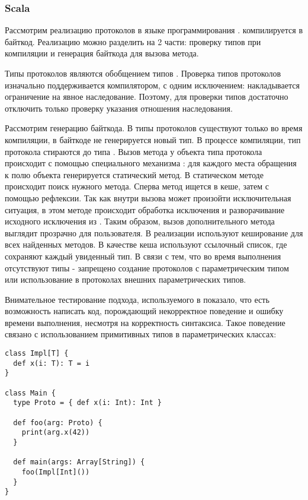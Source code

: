 \subsubsection{Scala}
Рассмотрим реализацию протоколов в языке программирования \cite{scala:structural}.  компилируется в  байткод. Реализацию можно разделить на 2 части: проверку типов при компиляции и генерация байткода для вызова метода.

Типы протоколов являются обобщением типов . Проверка типов протоколов изначально поддерживается компилятором, с одним исключением: накладывается ограничение на явное наследование. Поэтому, для проверки типов достаточно отключить только проверку указания отношения наследования.

Рассмотрим генерацию байткода. В  типы протоколов существуют только во время компиляции, в байткоде не генерируется новый тип. В процессе компиляции, тип протокола стираются до типа . Вызов метода у объекта типа протокола происходит с помощью специального механизма : для каждого места обращения к полю объекта генерируется статический метод. В статическом методе происходит поиск нужного метода. Сперва метод ищется в кеше\cite{9780262033848}, затем с помощью рефлексии. Так как внутри вызова может произойти исключительная ситуация, в этом методе происходит обработка исключения и разворачивание исходного исключения из . Таким образом, вызов дополнительного метода выглядит прозрачно для пользователя. В реализации используют кеширование для всех найденных методов. В качестве кеша используют ссылочный список, где сохраняют каждый увиденный тип. В связи с тем, что во время выполнения отсутствуют типы - запрещено создание протоколов с параметрическим типом или использование в протоколах внешних параметрических типов.

Внимательное тестирование подхода, используемого в  показало, что есть возможность написать код, порождающий некорректное поведение и ошибку времени выполнения, несмотря на корректность синтаксиса. Такое поведение связано с использованием примитивных типов в параметрических классах:

\begin{verbatim}
class Impl[T] {
  def x(i: T): T = i
}

class Main {
  type Proto = { def x(i: Int): Int }

  def foo(arg: Proto) {
    print(arg.x(42))
  }

  def main(args: Array[String]) {
    foo(Impl[Int]())
  }
}
\end{verbatim}

